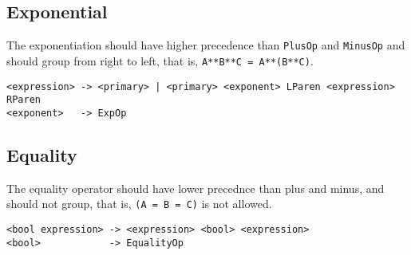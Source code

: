 \documentclass[11pt]{article}
\begin{document}
\subsection{Exponential}
\label{sec-2-1}
The exponentiation should have higher precedence than \texttt{PlusOp} and 
\texttt{MinusOp} and should group from right to left, that is, 
\texttt{A**B**C = A**(B**C)}.
\begin{verbatim}
<expression> -> <primary> | <primary> <exponent> LParen <expression> RParen
<exponent>   -> ExpOp
\end{verbatim}

\subsection{Equality}
\label{sec-2-2}
The equality operator should have lower precednce than plus and minus,
and should not group, that is, \texttt{(A = B = C)} is not allowed.
\begin{verbatim}
<bool expression> -> <expression> <bool> <expression>
<bool>            -> EqualityOp
\end{verbatim}
\end{document}
